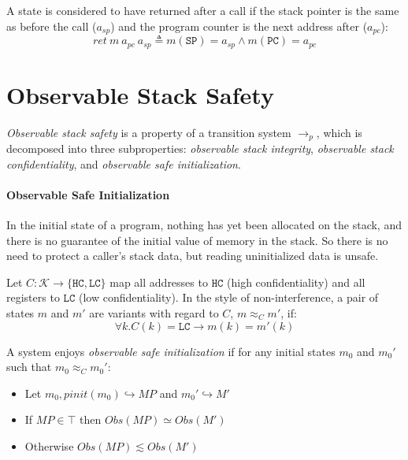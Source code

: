 \documentclass[conference]{IEEEtran}
\newcommand{\MP}{\mathit{MP}}
\begin{document}
      A state is considered to have returned after a call if the stack pointer is the same as before the call
      (\(a_{sp}\)) and the program counter is the next address after (\(a_{pc}\)):
      \[\mathit{ret}\ m\ a_{pc}\ a_{sp} \triangleq m(\mathtt{SP}) = a_{sp} \land m(\mathtt{PC}) = a_{pc}\]

  \section{Observable Stack Safety}

    {\it Observable stack safety} is a property of a transition system \(\longrightarrow_p\),
    which is decomposed into three subproperties: {\it observable stack integrity},
    {\it observable stack confidentiality}, and {\it observable safe initialization}. 


    \paragraph{Observable Safe Initialization}

      In the initial state of a program, nothing has yet been allocated on the stack, and
      there is no guarantee of the initial value of memory in the stack. So there is no
      need to protect a caller's stack data, but reading uninitialized data is unsafe.

      Let \(C : \mathcal{K} \rightarrow \{\mathtt{HC},\mathtt{LC}\}\) map all addresses
      to \(\mathtt{HC}\) (high confidentiality) and all registers to \(\mathtt{LC}\)
      (low confidentiality). In the style of non-interference, a pair of states \(m\)
      and \(m'\) are variants with regard to \(C\), \(m \approx_C m'\), if:
      \[\forall k . C(k) = \mathtt{LC} \rightarrow m(k) = m'(k)\]
      
      A system enjoys {\it observable safe initialization} if for any initial states \(m_0\)
      and \(m_0'\) such that \(m_0 \approx_C m_0'\):

      \begin{itemize}
        \item Let \(m_0,\mathit{pinit}(m_0) \hookrightarrow \MP\) and \(m_0' \hookrightarrow M'\)
        \item If \(\MP \in \top\) then \(\mathit{Obs}(\MP) \simeq \mathit{Obs}(M')\)
        \item Otherwise \(\mathit{Obs}(\MP) \lesssim \mathit{Obs}(M')\)
      \end{itemize}
\end{document}
